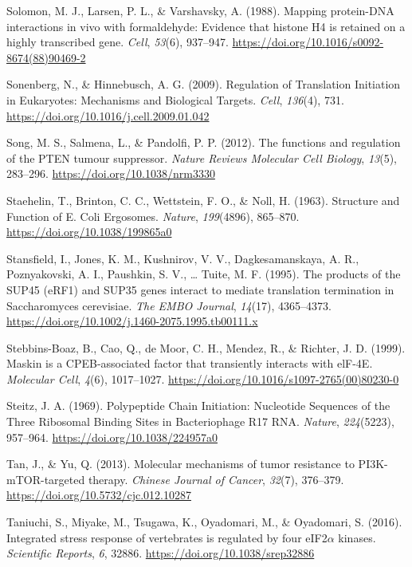 \documentclass[12pt,openany]{book}
\begin{document}
\hypertarget{ref-Solomon1988}{}
Solomon, M. J., Larsen, P. L., \& Varshavsky, A. (1988). Mapping
protein-DNA interactions in vivo with formaldehyde: Evidence that
histone H4 is retained on a highly transcribed gene. \emph{Cell},
\emph{53}(6), 937--947.
\url{https://doi.org/10.1016/s0092-8674(88)90469-2}

\hypertarget{ref-Sonenberg2009}{}
Sonenberg, N., \& Hinnebusch, A. G. (2009). Regulation of Translation
Initiation in Eukaryotes: Mechanisms and Biological Targets.
\emph{Cell}, \emph{136}(4), 731.
\url{https://doi.org/10.1016/j.cell.2009.01.042}

\hypertarget{ref-Song2012}{}
Song, M. S., Salmena, L., \& Pandolfi, P. P. (2012). The functions and
regulation of the PTEN tumour suppressor. \emph{Nature Reviews Molecular
Cell Biology}, \emph{13}(5), 283--296.
\url{https://doi.org/10.1038/nrm3330}

\hypertarget{ref-Staehelin1963}{}
Staehelin, T., Brinton, C. C., Wettstein, F. O., \& Noll, H. (1963).
Structure and Function of E. Coli Ergosomes. \emph{Nature},
\emph{199}(4896), 865--870. \url{https://doi.org/10.1038/199865a0}

\hypertarget{ref-Stansfield1995}{}
Stansfield, I., Jones, K. M., Kushnirov, V. V., Dagkesamanskaya, A. R.,
Poznyakovski, A. I., Paushkin, S. V., \ldots{} Tuite, M. F. (1995). The
products of the SUP45 (eRF1) and SUP35 genes interact to mediate
translation termination in Saccharomyces cerevisiae. \emph{The EMBO
Journal}, \emph{14}(17), 4365--4373.
\url{https://doi.org/10.1002/j.1460-2075.1995.tb00111.x}

\hypertarget{ref-Stebbins-Boaz1999}{}
Stebbins-Boaz, B., Cao, Q., de Moor, C. H., Mendez, R., \& Richter, J.
D. (1999). Maskin is a CPEB-associated factor that transiently interacts
with elF-4E. \emph{Molecular Cell}, \emph{4}(6), 1017--1027.
\url{https://doi.org/10.1016/s1097-2765(00)80230-0}

\hypertarget{ref-Steitz1969}{}
Steitz, J. A. (1969). Polypeptide Chain Initiation: Nucleotide Sequences
of the Three Ribosomal Binding Sites in Bacteriophage R17 RNA.
\emph{Nature}, \emph{224}(5223), 957--964.
\url{https://doi.org/10.1038/224957a0}

\hypertarget{ref-Tan2013}{}
Tan, J., \& Yu, Q. (2013). Molecular mechanisms of tumor resistance to
PI3K-mTOR-targeted therapy. \emph{Chinese Journal of Cancer},
\emph{32}(7), 376--379. \url{https://doi.org/10.5732/cjc.012.10287}

\hypertarget{ref-Taniuchi2016}{}
Taniuchi, S., Miyake, M., Tsugawa, K., Oyadomari, M., \& Oyadomari, S.
(2016). Integrated stress response of vertebrates is regulated by four
eIF2\(\alpha\) kinases. \emph{Scientific Reports}, \emph{6}, 32886.
\url{https://doi.org/10.1038/srep32886}
\end{document}
